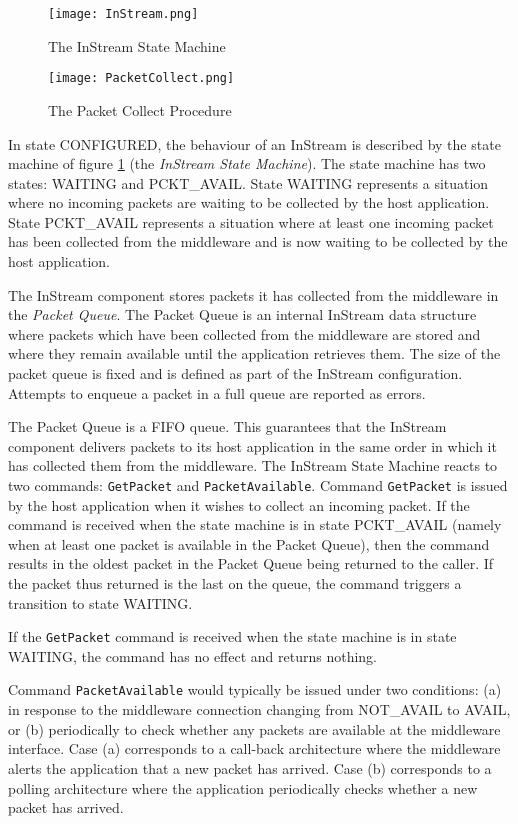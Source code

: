 \begin{figure}[ht]
 \centering
 \texttt{[image: InStream.png]}
 \caption{The InStream State Machine}
 \label{fig:InStream}
\end{figure}

\begin{figure}[h]
 \centering
 \texttt{[image: PacketCollect.png]}
 \caption{The Packet Collect Procedure}
 \label{fig:PacketCollect}
\end{figure}

In state CONFIGURED, the behaviour of an InStream is described by the state machine of figure \ref{fig:InStream} (the \textit{InStream State Machine}). The state machine has two states: WAITING and PCKT\_AVAIL. State WAITING represents a situation where no incoming packets are waiting to be collected by the host application. State PCKT\_AVAIL represents a situation where at least one incoming packet has been collected from the middleware and is now waiting to be collected by the host application. 

The InStream component stores packets it has collected from the middleware in the \textit{Packet Queue}. The Packet Queue is an internal InStream data structure where packets which have been collected from the middleware are stored and where they remain available until the application retrieves them. The size of the packet queue is fixed and is defined as part of the InStream configuration. Attempts to enqueue a packet in a full queue are reported as errors.

The Packet Queue is a FIFO queue. This guarantees that the InStream component delivers packets to its host application in the same order in which it has collected them from the middleware. The InStream State Machine reacts to two commands: \texttt{GetPacket} and \texttt{PacketAvailable}. Command \texttt{GetPacket} is issued by the host application when it wishes to collect an incoming packet. If the command is received when the state machine is in state PCKT\_AVAIL (namely when at least one packet is available in the Packet Queue), then the command results in the oldest packet in the Packet Queue being returned to the caller. If the packet thus returned is the last on the queue, the command triggers a transition to state WAITING. 

If the \texttt{GetPacket} command is received when the state machine is in state WAITING, the command has no effect and returns nothing.

Command \texttt{PacketAvailable} would typically be issued under two conditions: (a) in response to the middleware connection changing from NOT\_AVAIL to AVAIL, or (b) periodically to check whether any packets are available at the middleware interface. Case (a) corresponds to a call-back architecture where the middleware alerts the application that a new packet has arrived. Case (b) corresponds to a polling architecture where the application periodically checks whether a new packet has arrived. 

